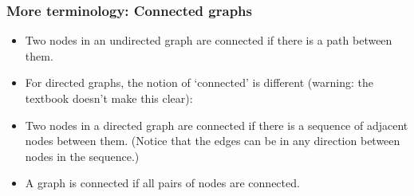    \begin{frame}[fragile]
\frametitle{More terminology: Connected graphs}

\begin{itemize}
\item Two nodes in an undirected graph are \color{blue}connected \color{black} if there is a path between them. 

\item For directed graphs, the notion of `connected' is different (warning: the textbook doesn't make this clear):

\item Two nodes in a directed graph are \color{blue}connected \color{black} 
if there is a sequence of adjacent nodes between them. (Notice that the edges can be in any direction between nodes in the sequence.)

\item A graph is \color{blue}connected \color{black} if all pairs of nodes are connected.
\end{itemize}
\end{frame}

